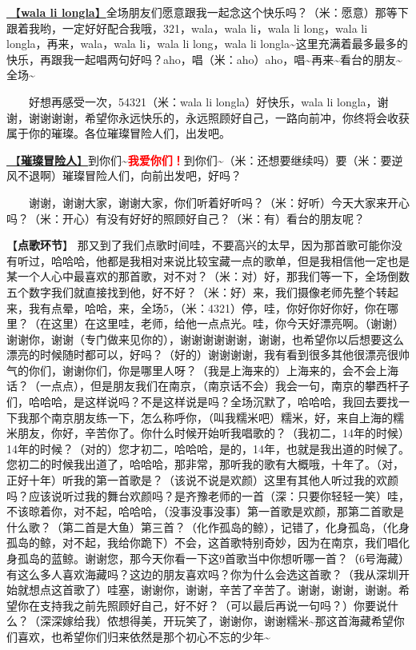 \documentclass[]{ctexbook}
\begin{document}
\hyperref[wala-li-longla]{🎵【\textbf{wala li longla}】}全场朋友们愿意跟我一起念这个快乐吗？（米：愿意）那等下跟着我哟，一定好好配合我哦，321，wala，wala li，wala li long，wala li longla，再来，wala，wala li，wala li long，wala li longla\textasciitilde 这里充满着最多最多的快乐，再跟我一起唱两句好吗？aho，唱（米：aho）aho，唱\textasciitilde 再来\textasciitilde 看台的朋友\textasciitilde 全场\textasciitilde{}

  好想再感受一次，54321（米：wala li longla）好快乐，wala li longla，谢谢，谢谢谢谢，希望你永远快乐的，永远照顾好自己，一路向前冲，你终将会收获属于你的璀璨。各位璀璨冒险人们，出发吧。

\hyperref[adventurers]{🎵【\textbf{璀璨冒险人}】}到你们\textasciitilde{}\textbf{\textcolor{red}{我爱你们！}}到你们\textasciitilde（米：还想要继续吗）要（米：要逆风不退啊）璀璨冒险人们，向前出发吧，好吗？

  谢谢，谢谢大家，谢谢大家，你们听着好听吗？（米：好听）今天大家来开心吗？（米：开心）有没有好好的照顾好自己？（米：有）看台的朋友呢？

【\textbf{点歌环节}】
那又到了我们点歌时间哇，不要高兴的太早，因为那首歌可能你没有听过，哈哈哈，他都是我相对来说比较宝藏一点的歌单，但是我相信他一定也是某一个人心中最喜欢的那首歌，对不对？（米：对）好，那我们等一下，全场倒数五个数字我们就直接找到他，好不好？（米：好）来，我们摄像老师先整个转起来，我有点晕，哈哈，来，全场5，（米：4321）停，哇，你好你好你好，你在哪里？（在这里）在这里哇，老师，给他一点点光。哇，你今天好漂亮啊。（谢谢）谢谢你，谢谢（专门做来见你的），谢谢谢谢谢谢，谢谢，也希望你以后想要这么漂亮的时候随时都可以，好吗？（好的）谢谢谢谢，我有看到很多其他很漂亮很帅气的你们，谢谢你们，你是哪里人呀？（我是上海来的）上海来的，会不会上海话？（一点点），但是朋友我们在南京，（南京话不会）我会一句，南京的攀西杆子们，哈哈哈，是这样说吗？不是这样说是吗？全场沉默了，哈哈哈，我回去要找一下我那个南京朋友练一下，怎么称呼你，（叫我糯米吧）糯米，好，来自上海的糯米朋友，你好，辛苦你了。你什么时候开始听我唱歌的？（我初二，14年的时候）14年的时候？（对的）您才初二，哈哈哈，是的，14年，也就是我出道的时候了。您初二的时候我出道了，哈哈哈，那非常，那听我的歌有大概哦，十年了。（对，正好十年）听我的第一首歌是？（该说不说是欢颜）这里有其他人听过我的欢颜吗？应该说听过我的舞台欢颜吗？是齐豫老师的一首（深：只要你轻轻一笑）哇，不该晾着你，对不起，哈哈哈，（没事没事没事）第一首歌是欢颜，那第二首歌是什么歌？（第二首是大鱼）第三首？（化作孤岛的鲸），记错了，化身孤岛，（化身孤岛的鲸，对不起，我给你跪下）不会，这首歌特别奇妙，因为在南京，我们唱化身孤岛的蓝鲸。谢谢您，那今天你看一下这9首歌当中你想听哪一首？（6号海藏）有这么多人喜欢海藏吗？这边的朋友喜欢吗？你为什么会选这首歌？（我从深圳开始就想点这首歌了）哇塞，谢谢你，谢谢，辛苦了辛苦了。谢谢，谢谢，谢谢。希望你在支持我之前先照顾好自己，好不好？（可以最后再说一句吗？）你要说什么？（深深嫁给我）侬想得美，开玩笑了，谢谢你，谢谢糯米\textasciitilde 那这首海藏希望你们喜欢，也希望你们归来依然是那个初心不忘的少年\textasciitilde{}
\end{document}
